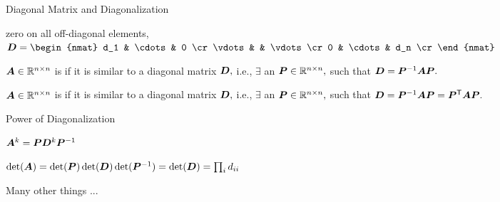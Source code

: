 \documentclass[handout,fleqn,aspectratio=169]{beamer}
\begin{document}
\begin{frame}{Diagonal Matrix and Diagonalization}

\plitemsep 0.1in

\bci

\item {} zero on all off-diagonal elements, $\mat{D} = 
\begin{nmat}
d_1 & \cdots & 0 \cr
\vdots &  & \vdots \cr
0 & \cdots & d_n \cr
\end{nmat}$


\item {} $\bm{A} \in {\mathbb R}^{n \times n}$ is  if it is similar to a diagonal matrix $\bm{D},$ i.e., $\exists$ an  $\bm{P} \in {\mathbb R}^{n \times n},$ such that $\bm{D} = {{\bm{P}}^{-1}} \bm{A} \bm{P}.$

\item {} $\bm{A} \in {\mathbb R}^{n \times n}$ is  if it is similar to a diagonal matrix $\bm{D},$ i.e., $\exists$ an   $\bm{P} \in {\mathbb R}^{n \times n},$ such that $\bm{D} = {{\bm{P}}^{-1}} \bm{A} \bm{P} = {\bm{P}}^{\mathsf{T}} \bm{A} \bm{P}.$


\eci

\end{frame}

\begin{frame}{Power of Diagonalization}

\plitemsep 0.2in

\bci


\item $\bm{A}^k = \bm{P} \bm{D}^k {{\bm{P}}^{-1}}$

\item $\det(\bm{A}) = \det(\bm{P})\det(\bm{D})\det({{\bm{P}}^{-1}}) = \det(\bm{D}) = \prod_i d_{ii}$ 

\item Many other things ...

\item \question {}

\eci

\end{frame}
\end{document}
